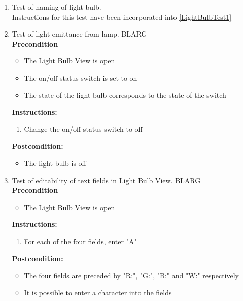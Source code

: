 \documentclass[a4paper]{article}
\newlength{\testlabellength}
\newenvironment{testlist}{\begin{enumerate}[label=\bfseries Instruction \thesubsection.\arabic* , labelindent=0pt, labelwidth=\testlabellength , leftmargin=2cm]}{\end{enumerate}}
\newenvironment{precondition}{
{\color{white}BLARG}\\ 
\textbf{Precondition}
\begin{itemize}[labelindent=0cm, labelwidth=2cm , leftmargin=1cm]
}
{\end{itemize}}
\newenvironment{instruction}{
\textbf{Instructions:}
\begin{enumerate}[label=\bfseries  \arabic*., labelindent=0cm, labelwidth=2cm , leftmargin=1cm]
}
{\end{enumerate}}
\newenvironment{postcondition}{
\textbf{Postcondition:}
\begin{itemize}[labelindent=0cm, labelwidth=2cm , leftmargin=1cm]
}
{\end{itemize}}
\begin{document}
\begin{appendices}
\begin{testlist}
	
	\item Test of naming of light bulb.\\
		Instructions for this test have been incorporated into \ref{LightBulbTest1}
    	
	
	\item Test of light emittance from lamp.
		\begin{precondition}
			\item The Light Bulb View is open
			\item The on/off-status switch is set to on
			\item The state of the light bulb corresponds to the state of the switch
		\end{precondition}
    	\begin{instruction}
    		\item Change the on/off-status switch to off
    	\end{instruction}
    	\begin{postcondition}
    		\item The light bulb is off
    	\end{postcondition}  		
  
   
   	\item Test of editability of text fields in Light Bulb View.
   		\begin{precondition}
   			\item The Light Bulb View is open
		\end{precondition}
    	\begin{instruction}
    		\item For each of the four fields, enter "A"
    	\end{instruction}
    	\begin{postcondition}
    		\item The four fields are preceded by "R:", "G:", "B:" and "W:" respectively
    		\item It is possible to enter a character into the fields
    	\end{postcondition}


\end{testlist}
\end{appendices}
\end{document}
